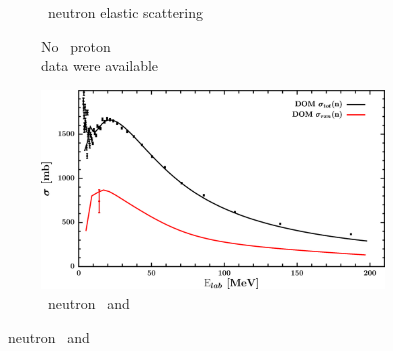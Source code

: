 \begin{figure}[hbtp]
\begin{subfigure}[c]{0.39\textheight}
        \caption{\oEight\ neutron elastic scattering}
        \label{DOMFitData_o18_neutron_elastic}
    \end{subfigure}\vspace{0.70in}
    \begin{subfigure}[c]{0.45\textwidth}
        \centering
        \caption{No \oEight\ proton \rxn\\ data were available}
        \label{DOMFitData_o18_proton_inelastic}
    \end{subfigure}\hspace{6pt}
    \begin{subfigure}[c]{0.45\textwidth}
        \centering
        \includegraphics[width=\linewidth]{figures/o18_neutronInelastic.png}
        \caption{\oEight\ neutron \rxn\ and \tot}
        \label{DOMFitData_o18_neutron_inelastic}
    \end{subfigure}
\end{figure}
\afterpage{\clearpage}

